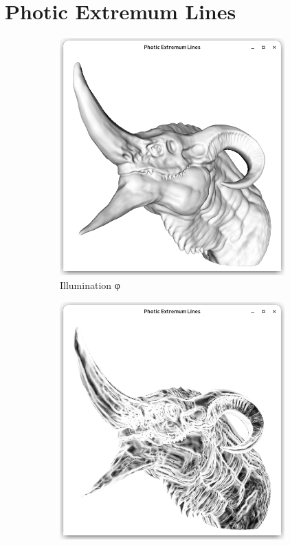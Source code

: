 \documentclass[9pt,fleqn,twoside,twocolumn]{stdglobal}
\begin{document}
\section{Photic Extremum Lines}

  \begin{figure}
    \centering
    \begin{subfigure}[b]{0.24\textwidth}
      \centering
      \includegraphics[width=0.95\textwidth,trim={15px 15 15 50},clip]{images/dragon-head-vertex-lighting.png}
      \caption{Illumination φ}
    \end{subfigure}%
    \hfill%
    \begin{subfigure}[b]{0.24\textwidth}
      \centering
      \includegraphics[width=0.95\textwidth,trim={15px 15 15 50},clip]{images/dragon-head-light-variation.png}

\end{subfigure}
\end{figure}
\end{document}
